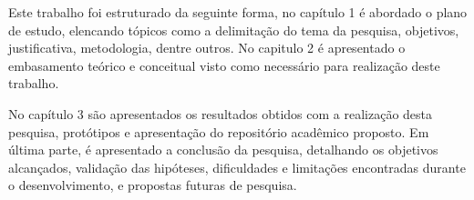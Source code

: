 Este trabalho foi estruturado da seguinte forma, no capítulo 1
é abordado o plano de estudo, elencando tópicos como a delimitação
do tema da pesquisa, objetivos, justificativa, metodologia, dentre outros.
No capitulo 2 é apresentado o embasamento teórico e conceitual
visto como necessário para realização deste trabalho.

No capítulo 3 são apresentados os resultados obtidos com a realização desta
pesquisa, protótipos e apresentação do repositório acadêmico proposto.
Em última parte, é apresentado a conclusão da pesquisa,
detalhando os objetivos alcançados, validação das hipóteses, dificuldades
e limitações encontradas durante o desenvolvimento, e propostas futuras
de pesquisa.